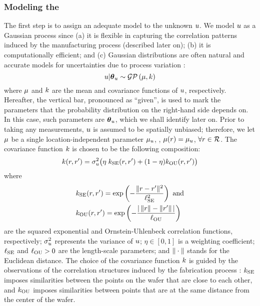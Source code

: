 \subsubsection{Modeling the \qoi}
The first step is to assign an adequate model to the unknown $u$. We model $u$ as a Gaussian process \cite{rasmussen2006} since (a) it is flexible in capturing the correlation patterns induced by the manufacturing process (described later on); (b) it is computationally efficient; and (c) Gaussian distributions are often natural and accurate models for uncertainties due to process variation \cite{srivastava2010, juan2011, juan2012}:
\begin{equation} \elabel{u-prior}
  \u | \vparam_\u \sim \gaussianp{\fMean}{\fCov}
\end{equation}
where $\fMean$ and $\fCov$ are the mean and covariance functions of $u$, respectively. Hereafter, the vertical bar, pronounced as ``given'', is used to mark the parameters that the probability distribution on the right-hand side depends on. In this case, such parameters are ${\boldsymbol\theta}_u$, which we shall identify later on. Prior to taking any measurements, $u$ is assumed to be spatially unbiased; therefore, we let $\fMean$ be a single location-independent parameter $\mu_u$, \ie, $\fMean{r} = \mu_\u$, $\forall r \in \mathcal{R}$.
The covariance function $\fCov$ is chosen to be the following composition:
\begin{equation} \elabel{covariance-function}
  \fCov{\r, \r'} = \sigma_\u^2 \big( \eta \; \fCov_\SE(\r, \r') + (1 - \eta) \fCov_\OU(\r, \r') \big)
\end{equation}
where
\begin{align*}
  & \fCov_\SE(\r, \r') = \exp\left(-\frac{\norm{\r - \r'}^2}{\ell_\SE^2}\right) \text{ and} \\
  & \fCov_\OU(\r, \r') = \exp\left(- \frac{\abs{\,\norm{\r} - \norm{\r'}\,}}{\ell_\OU} \right)
\end{align*}
are the squared exponential and Ornstein-Uhlenbeck correlation functions, respectively; $\sigma_u^2$ represents the variance of $u$; $\eta \in [0, 1]$ is a weighting coefficient; $\ell_{\text{SE}}$ and $\ell_{\text{OU}} > 0$ are the length-scale parameters; and $\| \cdot \|$ stands for the Euclidean distance.
The choice of the covariance function $\fCov$ is guided by the observations of the correlation structures induced by the fabrication process \cite{chandrakasan2001, cheng2011}: $\fCov_\SE$ imposes similarities between the points on the wafer that are close to each other, and $\fCov_\OU$ imposes similarities between points that are at the same distance from the center of the wafer.
